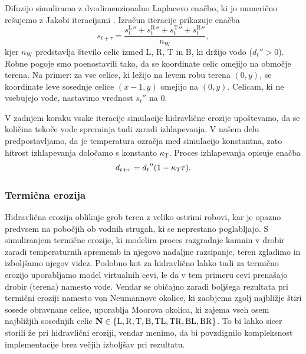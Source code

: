 \documentclass[9pt]{style/friteza}
\begin{document}
Difuzijo simuliramo z dvodimenzionalno Laplacevo enačbo, ki jo numerično rešujemo z Jakobi iteracijami \cite{laplace_gpu}. Izračun iteracije prikazuje enačba
\begin{equation} \label{eq:jakobi_iter}
s_{t+\tau} = \frac{{s^\mathrm{L}_{t}}'' + {s^\mathrm{R}_{t}}'' + {s^\mathrm{T}_{t}}'' + {s^\mathrm{B}_{t}}''}{n_\mathrm{W}},
\end{equation}
kjer $n_\mathrm{W}$ predstavlja število celic izmed L, R, T in B, ki držijo vodo (${d_{t}}'' > 0$). Robne pogoje smo poenostavili tako, da se koordinate celic omejijo na območje terena. Na primer: za vse celice, ki ležijo na levem robu terena $(0, y)$, se koordinate leve sosednje celice $(x-1, y)$ omejijo na $(0, y)$. Celicam, ki ne vsebujejo vode, nastavimo vrednost ${s_{t}}''$ na 0.

V zadnjem koraku vsake iteracije simulacije hidravlične erozije upoštevamo, da se količina tekoče vode spreminja tudi zaradi izhlapevanja. V našem delu predpostavljamo, da je temperatura ozračja med simulacijo konstantna, zato hitrost izhlapevanja določamo s konstanto $\kappa_\mathrm{T}$. Proces izhlapevanja opisuje enačba
\begin{equation}
d_{t + \tau} = {d_{t}}''(1 - {\kappa_\mathrm{T}} \tau).
\end{equation}

\subsubsection{Termična erozija}
Hidravlična erozija oblikuje grob teren z veliko ostrimi robovi, kar je opazno predvsem na pobočjih ob vodnih strugah, ki se neprestano poglabljajo. S simuliranjem termične erozije, ki modelira proces razgradnje kamnin v drobir zaradi temperaturnih sprememb in njegovo nadaljne razsipanje, teren zgladimo in izboljšamo njegov videz. Podobno kot za hidravlično lahko tudi za termično erozijo uporabljamo model virtualnih cevi, le da v tem primeru cevi prenašajo drobir (terena) namesto vode. Vendar se običajno \cite{jako_fast_gpu_11,maske_2013} zaradi boljšega rezultata pri termični eroziji namesto von Neumannove okolice, ki zaobjema zgolj najbližje štiri sosede obravnane celice, uporablja Moorova okolica, ki zajema vseh osem najbližjih sosednjih celic $\mathbf{N} \in \left\{\mathrm{L},\mathrm{R},\mathrm{T},\mathrm{B}, \mathrm{TL},\mathrm{TR},\mathrm{BL},\mathrm{BR}\right\}$. To bi lahko sicer storili že pri hidravlični eroziji, vendar menimo, da bi povzdignilo kompleksnost implementacije brez večjih izboljšav pri rezultatu.
\end{document}
